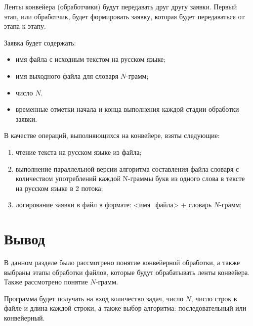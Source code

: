 Ленты конвейера (обработчики) будут передавать друг другу заявки. Первый этап, или обработчик, будет формировать заявку, которая будет передаваться от этапа к этапу.

Заявка будет содержать:

\begin{itemize}[label*=--]
	\item имя файла с исходным текстом на русском языке;
	\item имя выходного файла для словаря $N$-грамм;
	\item число $N$.
	\item временные отметки начала и конца выполнения каждой стадии обработки заявки.
\end{itemize}

В качестве операций, выполняющихся на конвейере, взяты следующие:

\begin{enumerate}[label={\arabic*)}]
	\item чтение текста на русском языке из файла;
	\item выполнение параллельной версии алгоритма составления файла словаря с количеством употреблений каждой N-граммы букв из одного слова в тексте на русском языке в 2 потока;
	\item логирование заявки в файл в формате: <имя\_файла> + словарь $N$-грамм;
\end{enumerate}

\section*{Вывод}

В данном разделе было рассмотрено понятие конвейерной обработки,
а также выбраны этапы обработки файлов, которые будут обрабатывать ленты конвейера. 
Также рассмотрено понятие $N$-грамм.

Программа будет получать на вход количество задач, число $N$, число строк в файле и длина каждой строки, а также выбор алгоритма: последовательный или конвейерный.
